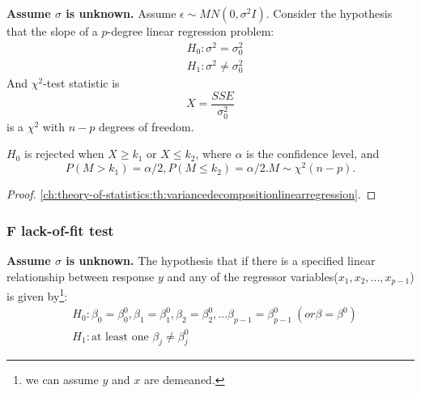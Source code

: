 \begin{refsection}
\begin{method}\cite[261]{chinese2008probability}
	\textbf{Assume $\sigma$ is unknown.}	Assume $\epsilon \sim MN(0,\sigma^2 I)$. Consider the hypothesis that the slope of a $p$-degree linear regression problem:
	\begin{align*}
	&H_0: \sigma^2 = \sigma^2_{0} \\
	&H_1: \sigma^2 \neq \sigma^2_{0}
	\end{align*}
	And $\chi^2$-test statistic is
	$$X = \frac{SSE}{\sigma^2_0}$$
	is a $\chi^2$ with $n-p$ degrees of freedom. 
	
	$H_0$ is rejected when $X \geq k_1$ or $X\leq k_2$,
	where $\alpha$ is the confidence level, and  $$P(M > k_1) = \alpha/2, P(M \leq k_2) = \alpha/2. M\sim \chi^2(n-p).$$
\end{method}
\begin{proof}
	\autoref{ch:theory-of-statistics:th:variancedecompositionlinearregression}.
\end{proof}

\subsubsection{F lack-of-fit test}

\begin{lemma}\cite[80]{montgomery2012introduction}\cite[139]{theil1971principles}\label{ch:statistical-models:th:LackOfFitFtestMultipleRegression}
	\textbf{Assume $\sigma$ is unknown.}
	The hypothesis that if there is a specified linear relationship between response $y$ and any of the regressor variables($x_1,x_2,...,x_{p-1}$) is given by\footnote{we can assume $y$ and $x$ are demeaned.}:
	\begin{align*}
	&H_0: \beta_0 = \beta_0^0, \beta_1 = \beta_1^0, \beta_2 = \beta_2^0, ...  \beta_{p-1} = \beta_{p-1}^0~(or \beta = \beta^0)\\
	&H_1: \text{at least one }\beta_j \neq \beta_j^0
	\end{align*}	
	

\end{lemma}
\end{refsection}
